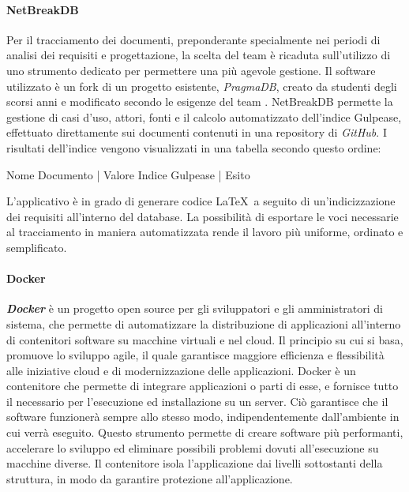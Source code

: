 		\paragraph{NetBreakDB}
		Per il tracciamento dei documenti, preponderante specialmente nei periodi di analisi dei requisiti e progettazione, la scelta del team è ricaduta sull'utilizzo di uno strumento dedicato per permettere una più agevole gestione. Il software utilizzato è un fork di un progetto esistente, \textit{PragmaDB}, creato da studenti degli scorsi anni e modificato secondo le esigenze del team \textit{ \gruppo }. NetBreakDB permette la gestione di casi d'uso, attori, fonti e il calcolo automatizzato dell'indice Gulpease, effettuato direttamente sui documenti contenuti in una repository di \textit{GitHub}. I risultati dell'indice vengono visualizzati in una tabella secondo questo ordine:
		\begin{center}
			Nome Documento | Valore Indice Gulpease | Esito
		\end{center}
		L'applicativo è in grado di generare codice \LaTeX\ a seguito di un'indicizzazione dei requisiti all'interno del database. La possibilità di esportare le voci necessarie al tracciamento in maniera automatizzata rende il lavoro più uniforme, ordinato e semplificato.
		
		\paragraph{Docker}
		\textbf{\textit{Docker}} è un progetto open source per gli sviluppatori e gli amministratori di sistema, che permette di automatizzare la distribuzione di applicazioni all'interno di contenitori software su macchine virtuali e nel cloud. Il principio su cui si basa, promuove lo sviluppo agile, il quale garantisce maggiore efficienza e flessibilità alle iniziative cloud e di modernizzazione delle applicazioni. Docker è un contenitore che permette di integrare applicazioni o parti di esse, e fornisce tutto il necessario per l'esecuzione ed installazione su un server. Ciò garantisce che il software funzionerà sempre allo stesso modo, indipendentemente dall'ambiente in cui verrà eseguito. Questo strumento permette di creare software più performanti, accelerare lo sviluppo ed eliminare possibili problemi dovuti all'esecuzione su macchine diverse. Il contenitore isola l'applicazione dai livelli sottostanti della struttura, in modo da garantire protezione all'applicazione. 
			
